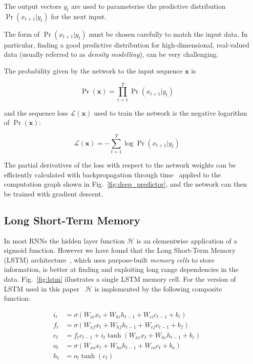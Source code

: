 The output vectors $y_t$ are used to parameterise the predictive distribution $\Pr(x_{t+1}|y_t)$ for the next input.

The form of $\Pr(x_{t+1}|y_t)$ must be chosen carefully to match the input data. In particular, finding a good predictive distribution for high-dimensional, real-valued data (usually referred to as \emph{density modelling}), can be very challenging.

The probability given by the network to the input sequence $\mathbf{x}$ is

\begin{equation}
\Pr(\mathbf{x}) = \prod_{t=1}^T{\Pr(x_{t+1}|y_t)}
\end{equation}

and the sequence loss $\mathcal{L}(\mathbf{x})$ used to train the network is the negative logarithm of $\Pr(\mathbf{x})$:

\begin{equation}
\label{eq:loss}
\mathcal{L}(\mathbf{x}) = -\sum_{t=1}^T{\log \Pr(x_{t+1}|y_t)}
\end{equation}

The partial derivatives of the loss with respect to the network weights can be efficiently calculated with backpropagation through time~\cite{williams95bptt} applied to the computation graph shown in Fig.~\ref{fig:deep_predictor}, and the network can then be trained with gradient descent.

\subsection{Long Short-Term Memory}
\label{sec:lstm}
In most RNNs the hidden layer function $\mathcal{H}$ is an elementwise application of a sigmoid function. However we have found that the Long Short-Term Memory (LSTM) architecture~\cite{hochreiter97lstm}, which uses purpose-built \emph{memory cells} to store information, is better at finding and exploiting long range dependencies in the data.
Fig.~\ref{fig:lstm} illustrates a single LSTM memory cell. For the version of LSTM used in this paper~\cite{gers02peepholes} $\mathcal{H}$ is implemented by the following composite function:

\begin{align}
i_t &= \sigma\left(W_{x i} x_t + W_{h i} h_{t-1} + W_{c i} c_{t-1}  + b_i\right)\\
f_t &= \sigma\left(W_{x f} x_t + W_{h f} h_{t-1} + W_{c f} c_{t-1} + b_f \right)\\
c_t &= f_t c_{t-1} + i_t \tanh \left(W_{x c} x_t + W_{h c} h_{t-1} + b_c\right)\\
o_t &= \sigma\left(W_{x o} x_t + W_{h o} h_{t-1} + W_{c o} c_{t} + b_o\right)\\
h_t &= o_t \tanh(c_t)
\end{align}

